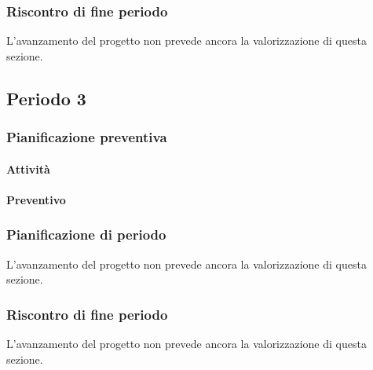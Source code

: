 \subsubsection{Riscontro di fine periodo}

L'avanzamento del progetto non prevede ancora la valorizzazione di questa sezione.






\subsection{Periodo 3}

\subsubsection{Pianificazione preventiva}

\paragraph{Attività}

\planningTable{
	
}

\paragraph{Preventivo}

\smallPreventivoTable{
	
}

\subsubsection{Pianificazione di periodo}


L'avanzamento del progetto non prevede ancora la valorizzazione di questa sezione.



\subsubsection{Riscontro di fine periodo}


L'avanzamento del progetto non prevede ancora la valorizzazione di questa sezione.
